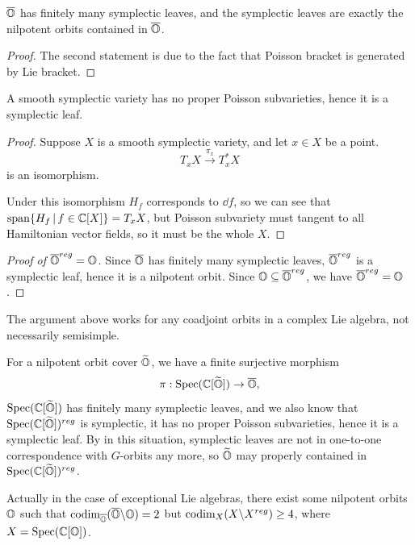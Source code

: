 \begin{lem}
  $\overline{\mathbb{O}}$ has finitely many symplectic leaves, and the symplectic leaves are exactly the nilpotent orbits contained in $\overline{\mathbb{O}}$.
\end{lem}

\begin{proof}
  The second statement is due to the fact that Poisson bracket is generated by Lie bracket.
\end{proof}

\begin{lem}
  A smooth symplectic variety has no proper Poisson subvarieties, hence it is a symplectic leaf.
\end{lem}

\begin{proof}
  Suppose $X$ is a smooth symplectic variety, and let $x \in X$ be a point.
  \[T_x X \xrightarrow{\pi_x} T_x^* X\]
  is an isomorphism.

  Under this isomorphism $H_f$ corresponds to $\dd f$, so we can see that $\mathrm{span}\{H_f\,|\,f \in \mathbb{C}[X]\} = T_x X$, but Poisson subvariety must tangent to all Hamiltonian vector fields, so it must be the whole $X$.
\end{proof}


\begin{proof}[Proof of $\overline{\mathbb{O}}^{reg} = \mathbb{O}$]
  Since $\overline{\mathbb{O}}$ has finitely many symplectic leaves, $\overline{\mathbb{O}}^{reg}$ is a symplectic leaf, hence it is a nilpotent orbit. Since $\mathbb{O} \subseteq \overline{\mathbb{O}}^{reg}$, we have $\overline{\mathbb{O}}^{reg} = \mathbb{O}$.
\end{proof}



\begin{rk}
  The argument above works for any coadjoint orbits in a complex Lie algebra, not necessarily semisimple.
\end{rk}



\begin{rk}
  For a nilpotent orbit cover $\widetilde{\mathbb{O}}$, we have a finite surjective morphism
  \[
    \pi: \operatorname{Spec}(\mathbb{C}[\widetilde{\mathbb{O}}]) \to \overline{\mathbb{O}},
  \]
  $\operatorname{Spec}(\mathbb{C}[\widetilde{\mathbb{O}}])$ has finitely many symplectic leaves, and we also know that $\operatorname{Spec}(\mathbb{C}[\widetilde{\mathbb{O}}])^{reg}$ is symplectic, it has no proper Poisson subvarieties, hence it is a symplectic leaf. By in this situation, symplectic leaves are not in one-to-one correspondence with $G$-orbits any more, so $\widetilde{\mathbb{O}}$ may properly contained in $\operatorname{Spec}(\mathbb{C}[\widetilde{\mathbb{O}}])^{reg}$.

  Actually in the case of exceptional Lie algebras, there exist some nilpotent orbits $\mathbb{O}$ such that $\operatorname{codim}_{\overline{\mathbb{O}}}(\overline{\mathbb{O}} \backslash \mathbb{O}) = 2$ but $\operatorname{codim}_{X}(X \backslash X^{reg}) \geq 4$, where $X = \operatorname{Spec}(\mathbb{C}[\mathbb{O}])$.
\end{rk}


